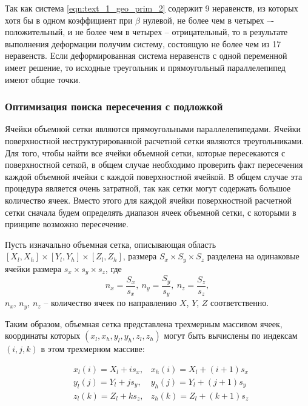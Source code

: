 Так как система \eqref{eqn:text_1_geo_prim_2} содержит 9 неравенств, из которых хотя бы в одном коэффициент при $\beta$ нулевой, не более чем в четырех –- положительный, и не более чем в четырех -- отрицательный, то в результате выполнения деформации получим систему, состоящую не более чем из 17 неравенств.
Если деформированная система неравенств с одной переменной имеет решение, то исходные треугольник и прямоугольный параллелепипед имеют общие точки.

\subsubsection{Оптимизация поиска пересечения с подложкой}

Ячейки объемной сетки являются прямоугольными параллелепипедами.
Ячейки поверхностной неструктурированной расчетной сетки являются треугольниками.
Для того, чтобы найти все ячейки объемной сетки, которые пересекаются с поверхностной сеткой, в общем случае необходимо проверить факт пересечения каждой объемной ячейки с каждой поверхностной ячейкой.
В общем случае эта процедура является очень затратной, так как сетки могут содержать большое количество ячеек.
Вместо этого для каждой ячейки поверхностной расчетной сетки сначала будем определять диапазон ячеек объемной сетки, с которыми в принципе возможно пересечение.

Пусть изначально объемная сетка, описывающая область $[X_l, X_h] \times [Y_l, Y_h] \times [Z_l, Z_h]$, размера $S_x \times S_y \times S_z$ разделена на одинаковые ячейки размера $s_x \times s_y \times s_z$, где
\begin{equation}
	n_x = \frac{S_x}{s_x}, \ n_y = \frac{S_y}{s_y}, \ n_z = \frac{S_z}{s_z},
\end{equation}
$n_x$, $n_y$, $n_z$ -- количество ячеек по направлению $X$, $Y$, $Z$ соответственно.

Таким образом, объемная сетка представлена трехмерным массивом ячеек, координаты которых $(x_l, x_h, y_l, y_h, z_l, z_h)$ могут быть вычислены по индексам $(i, j, k)$ в этом трехмерном массиве:

\begin{equation}
	\begin{aligned}
		& x_l(i) = X_l + i s_x, & x_h(i) = X_l + (i + 1) s_x \\
		& y_l(j) = Y_l + j s_y, & y_h(j) = Y_l + (j + 1) s_y \\
		& z_l(k) = Z_l + k s_z, & z_h(k) = Z_l + (k + 1) s_z		
	\end{aligned}
\end{equation}

